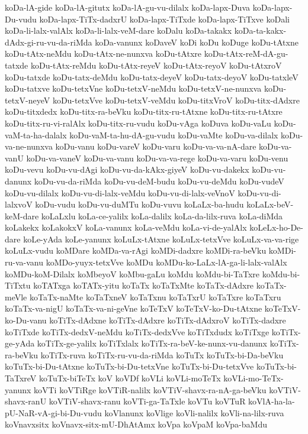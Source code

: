 {koDa-lA-gide
koDa-lA-gitutx
koDa-lA-gu-vu-dilalx
koDa-lapx-Duva
koDa-lapx-Du-vudu
koDa-lapx-TiTx-dadxrU
koDa-lapx-TiTxde
koDa-lapx-TiTxve
koDali
koDa-li-lalx-valAlx
koDa-li-lalx-veM-dare
koDalu
koDa-takakx
koDa-ta-kakx-dAdx-gi-ru-vu-da-riMda
koDa-vanunx
koDaveV
koDi
koDu
koDuge
koDu-tAtxne
koDu-tAtx-neMdu
koDu-tAtx-ne-nunxva
koDu-tAtxre
koDu-tAtx-reM-dA-gu-tatxde
koDu-tAtx-reMdu
koDu-tAtx-reyeV
koDu-tAtx-reyoV
koDu-tAtxroV
koDu-tatxde
koDu-tatx-deMdu
koDu-tatx-deyeV
koDu-tatx-deyoV
koDu-tatxleV
koDu-tatxve
koDu-tetxVne
koDu-tetxV-neMdu
koDu-tetxV-ne-nunxva
koDu-tetxV-neyeV
koDu-tetxVve
koDu-tetxV-veMdu
koDu-titxVroV
koDu-titx-dAdxre
koDu-titxdedx
koDu-titx-ra-beVku
koDu-titx-ru-tAtxne
koDu-titx-ru-tAtxre
koDu-titx-ru-vi-ralAlx
koDu-titx-ru-vudu
koDu-vAga
koDuva
koDu-vaLu
koDu-vaM-ta-ha-dalalx
koDu-vaM-ta-hu-dA-gu-vudu
koDu-vaMte
koDu-va-dilalx
koDu-va-ne-nunxva
koDu-vanu
koDu-vareV
koDu-varu
koDu-va-va-nA-dare
koDu-va-vanU
koDu-va-vaneV
koDu-va-vanu
koDu-va-va-rege
koDu-va-varu
koDu-venu
koDu-vevu
koDu-vu-dAgi
koDu-vu-da-kAkx-giyeV
koDu-vu-dakekx
koDu-vu-danunx
koDu-vu-da-riMda
koDu-vu-deM-budu
koDu-vu-deMdu
koDu-vudeV
koDu-vu-dilalx
koDu-vu-di-lalx-veMdu
koDu-vu-di-lalx-veVnoV
koDu-vu-di-lalxvoV
koDu-vudu
koDu-vu-duMTu
koDu-vuvu
koLaLx-ba-hudu
koLaLx-beV-keM-dare
koLaLxlu
koLa-ce-yalilx
koLa-dalilx
koLa-da-lilx-ruva
koLa-diMda
koLakekx
koLakokxV
koLa-vanunx
koLa-veMdu
koLa-vi-de-yalAlx
koLeLx-ho-De-dare
koLe-yAda
koLe-yanunx
koLuLx-tAtxne
koLuLx-tetxVve
koLuLx-va-va-rige
koLuLx-vudu
koMDare
koMDa-va-rAgi
koMDi-dadxre
koMDi-ra-beVku
koMDi-ru-va-vanu
koMDo-yuyx-tetxVve
koMDu
koMDu-ko-LaLx-lA-ga-li-lalx-valAlx
koMDu-koM-Dilalx
koMbeyoV
koMbu-gaLu
koMdu
koMdu-bi-TaTxre
koMdu-bi-TiTxtu
koTATxga
koTATx-yitu
koTaTx
koTaTxMte
koTaTx-dAdxre
koTaTx-meVle
koTaTx-naMte
koTaTxneV
koTaTxnu
koTaTxrU
koTaTxre
koTaTxru
koTaTx-va-nigU
koTaTx-va-ni-geVne
koTeTxV
koTeTxV-ko-Du-tAtxne
koTeTxV-ko-Du-vanu
koTiTx-dAdxne
koTiTx-dAdxre
koTiTx-dAdxroV
koTiTx-dadxre
koTiTxde
koTiTx-dedxV-neMdu
koTiTx-dedxVve
koTiTxdudx
koTiTxge
koTiTx-ge-yAda
koTiTx-ge-yalilx
koTiTxlalx
koTiTx-ra-beV-ke-nunx-vu-danunx
koTiTx-ra-beVku
koTiTx-ruva
koTiTx-ru-vu-da-riMda
koTuTx
koTuTx-bi-Da-beVku
koTuTx-bi-Du-tAtxne
koTuTx-bi-Du-tetxVne
koTuTx-bi-Du-tetxVve
koTuTx-bi-TaTxreV
koTuTx-biTeTx
koV
koVDf
koVLi
koVLi-moTeTx
koVLi-mo-TeTx-yanunx
koVTi
koVTiRge
koVTiR-nalilx
koVTiV-shavx-ra-nA-ga-beVku
koVTiV-shavx-ranU
koVTiV-shavx-ranu
koVTi-ga-TaTxle
koVTu
koVTuR
koVlA-ha-la-pU-NaR-vA-gi-bi-Du-vudu
koVlanunx
koVlige
koVli-nalilx
koVli-na-lilx-ruva
koVnavxsitx
koVnavx-sitx-mU-DhAtAmx
koVpa
koVpaM
koVpa-baMdu
}
